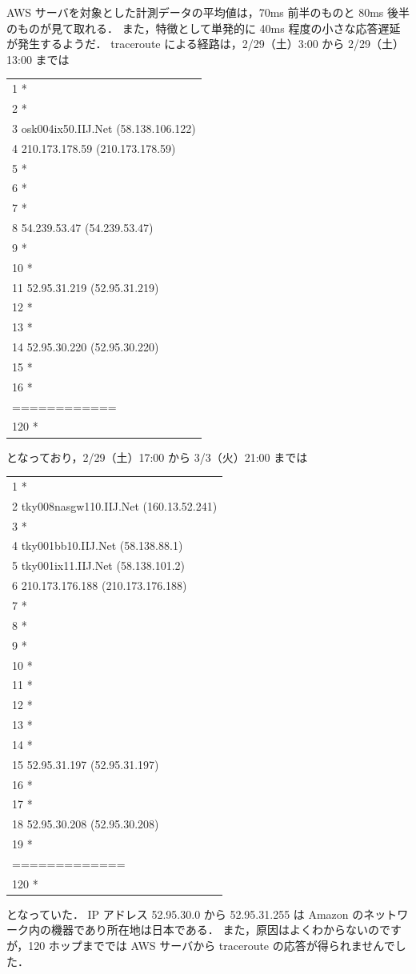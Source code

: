 \documentclass[a4j]{jarticle}
\begin{document}
AWS サーバを対象とした計測データの平均値は，70ms 前半のものと 80ms 後半のものが見て取れる．
また，特徴として単発的に 40ms 程度の小さな応答遅延が発生するようだ．
traceroute による経路は，2/29（土）3:00 から 2/29（土）13:00 までは
\begin{table}[H]
\centering
\begin{tabular}{l}
 1  *\\
 2  *\\
 3  osk004ix50.IIJ.Net (58.138.106.122)\\
 4  210.173.178.59 (210.173.178.59)\\
 5  *\\
 6  *\\
 7  *\\
 8  54.239.53.47 (54.239.53.47)\\
 9  *\\
10  *\\
11  52.95.31.219 (52.95.31.219)\\
12  *\\
13  *\\
14  52.95.30.220 (52.95.30.220)\\
15  *\\
16  *\\
============\\
120 *\\
\end{tabular}
\end{table}
となっており，2/29（土）17:00 から 3/3（火）21:00 までは
\begin{table}[H]
\centering
\begin{tabular}{l}
 1  *\\
 2  tky008nasgw110.IIJ.Net (160.13.52.241)\\
 3  *\\
 4  tky001bb10.IIJ.Net (58.138.88.1)\\
 5  tky001ix11.IIJ.Net (58.138.101.2)\\
 6  210.173.176.188 (210.173.176.188)\\
 7  *\\
 8  *\\
 9  *\\
10  *\\
11  *\\
12  *\\
13  *\\
14  *\\
15  52.95.31.197 (52.95.31.197)\\
16  *\\
17  *\\
18  52.95.30.208 (52.95.30.208)\\
19  *\\
=============\\
120  *\\
\end{tabular}
\end{table}
となっていた．
IP アドレス 52.95.30.0 から 52.95.31.255 は Amazon のネットワーク内の機器であり所在地は日本である．
また，原因はよくわからないのですが，120 ホップまででは AWS サーバから traceroute の応答が得られませんでした．
\end{document}
